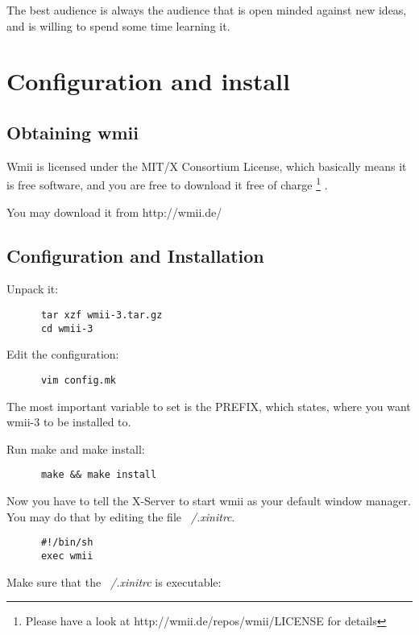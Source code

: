 \documentclass[12pt,a4paper]{article}
\begin{document}
    The best audience is always the audience that is open minded
    against new ideas, and is willing to spend some time learning it.
  
\section{Configuration and install}

  \subsection{Obtaining wmii}

    Wmii is licensed under the MIT/X Consortium License, which
    basically means it is free software, and you are free to download
    it free of charge
    \footnote{Please have a look at http://wmii.de/repos/wmii/LICENSE
    for details} .

    You may download it from http://wmii.de/
  
  \subsection{Configuration and Installation}

    Unpack it:
  
    \begin{verbatim}
      tar xzf wmii-3.tar.gz
      cd wmii-3
    \end{verbatim}
  
    Edit the configuration:

    \begin{verbatim}
      vim config.mk
    \end{verbatim}

    The most important variable to set is the PREFIX, which states,
    where you want wmii-3 to be installed to.

    Run make and make install:

    \begin{verbatim}
      make && make install
    \end{verbatim}

    Now you have to tell the X-Server to start wmii as your default
    window manager. You may do that by editing the file
    \emph{~/.xinitrc}.

    \begin{verbatim}
      #!/bin/sh
      exec wmii
    \end{verbatim}

    Make sure that the \emph{~/.xinitrc} is executable:
\end{document}
